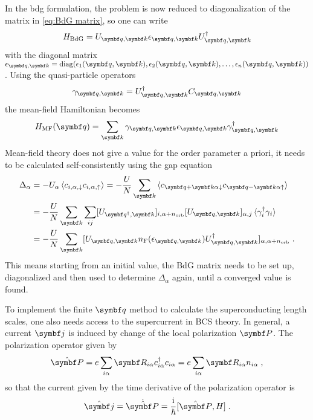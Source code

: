 \documentclass[../notes.tex]{subfiles}
\begin{document}
In the \acrshort{bdg} formulation, the problem is now reduced to diagonalization of the matrix in \cref{eq:BdG matrix}, so one can write
\begin{equation}
	H_{\mathrm{BdG}} = U_{\vb{q}, \vb{k}} \epsilon_{\vb{q}, \vb{k}} U_{\vb{q}, \vb{k}}^{\dagger}
\end{equation}
with the diagonal matrix \(\epsilon_{\vb{q}, \vb{k}} = \diag(\epsilon_1 (\vb{q}, \vb{k}), \epsilon_2 (\vb{q}, \vb{k}), \ldots, \epsilon_n (\vb{q}, \vb{k}))\).
Using the quasi-particle operators
\begin{equation}
	\gamma_{\vb{q}, \vb{k}} = U_{\vb{q}, \vb{k}}^{\dagger} C_{\vb{q}, \vb{k}}
\end{equation}
the mean-field Hamiltonian becomes
\begin{equation}
	H_{\mathrm{MF}} (\vb{q}) = \sum_{\vb{k}} \gamma_{\vb{q}, \vb{k}} \epsilon_{\vb{q}, \vb{k}} \gamma_{\vb{q}, \vb{k}}^{\dagger}
\end{equation}
Mean-field theory does not give a value for the order parameter a priori, it needs to be calculated self-consistently using the gap equation 
\begin{align}
	\Delta_{\alpha} &= -U_{\alpha} \braket{c_{i, \alpha, \downarrow} c_{i, \alpha, \uparrow}} = -\frac{U}{N} \sum_{\vb{k}} \braket{c_{\vb{q}+\vb{k} \alpha \downarrow} c_{\vb{q}-\vb{k} \alpha \uparrow}} \nonumber \\
	&= -\frac{U}{N} \sum_{\vb{k}} \sum_{ij} [U_{\vb{q}^{\dagger}, \vb{k}}]_{i, \alpha + n_{\mathrm{orb}}} [U_{\vb{q}, \vb{k}}]_{\alpha, j} \braket{\gamma_i^{\dagger} \gamma_i}  \\
	&= -\frac{U}{N} \sum_{\vb{k}} [U_{\vb{q}, \vb{k}} n_{\mathrm{F}} (\epsilon_{\vb{q}, \vb{k}}) U_{\vb{q}, \vb{k}}^{\dagger}]_{\alpha, \alpha + n_{\mathrm{orb}}} \nonumber \;.
\end{align}
This means starting from an initial value, the BdG matrix needs to be set up, diagonalized and then used to determine \(\Delta_{\alpha}\) again, until a converged value is found.

To implement the finite \(\vb{q}\) method to calculate the superconducting length scales, one also needs access to the supercurrent in BCS theory.
In general, a current \(\vb{j}\) is induced by change of the local polarization \(\vb{P}\).
The polarization operator given by
\begin{equation}
	\ope{\vb{P}} = e \sum_{i \alpha} \vb{R}_{i \alpha} c_{i \alpha}^{\dagger} c_{i \alpha} = e \sum_{i \alpha} \vb{R}_{i \alpha} n_{i \alpha} \;,
\end{equation}
so that the current given by the time derivative of the polarization operator is
\begin{equation}
	\ope{\vb{j}} = \dot{\ope{\vb{P}}} = \frac{\iu}{\hbar} [\ope{\vb{P}}, H]
	\label{eq:current operator as time der of polarization} \;.
\end{equation}
\end{document}
